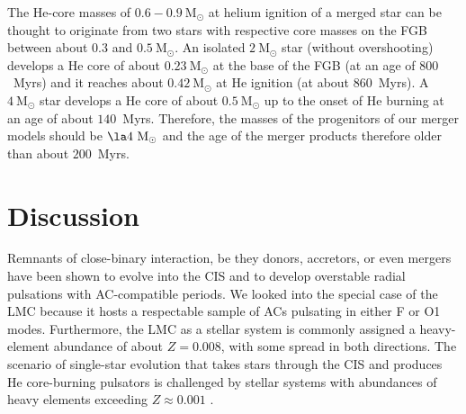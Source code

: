 \documentclass[a4paper,fleqn,usenatbib]{mnras}
\newcommand{\msol}{~\mathrm{M}_\odot}
\begin{document}
 
The He-core masses of $0.6 - 0.9 \msol$ at helium ignition of a merged star
can be thought to originate from two
stars with respective core masses on the FGB between about $0.3$ and $0.5 \msol$. 
An isolated $2 \msol$ star (without overshooting) develops a He core of about $0.23 \msol$ 
at the base of the FGB (at an age of $800$~Myrs) and it reaches about $0.42 \msol$ at 
He ignition (at about $860$~Myrs). A $4 \msol$ star develops a He core of about 
$0.5 \msol$ up to the onset of He burning at an age of about $140$~Myrs.
Therefore, the masses of the progenitors of our merger models should be $\la 4 \msol$ 
and the age of the merger products therefore older than about $200$~Myrs.  
 
\section{Discussion}
Remnants of close-binary interaction, be they donors, accretors, or even 
mergers have been shown to evolve into the CIS and to develop 
overstable radial pulsations with AC-compatible periods. 
We looked into the special case of the LMC because it hosts a respectable sample of ACs 
pulsating in either F or O1 modes. Furthermore, the LMC as a stellar system is commonly assigned 
a heavy-element abundance of about $Z=0.008$, with some spread in both directions. The scenario
of single-star evolution that takes stars through the CIS and produces He core-burning pulsators 
is challenged by stellar systems with abundances of heavy elements exceeding $Z\approx 0.001$ 
\citep{Fiorentino2012}. 
\end{document}
